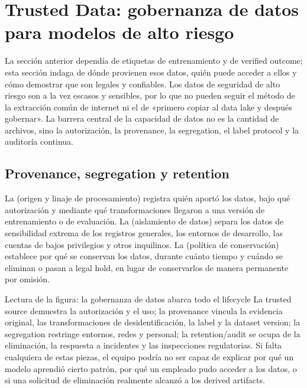 \section{Trusted Data: gobernanza de datos para modelos de alto riesgo}

La sección anterior dependía de etiquetas de entrenamiento y de verified outcome; esta sección indaga de dónde provienen esos datos, quién puede acceder a ellos y cómo demostrar que son legales y confiables. Los datos de seguridad de alto riesgo son a la vez escasos y sensibles, por lo que no pueden seguir el método de la extracción común de internet ni el de «primero copiar al data lake y después gobernar». La barrera central de la capacidad de datos no es la cantidad de archivos, sino la autorización, la provenance, la segregation, el label protocol y la auditoría continua.

\subsection{Provenance, segregation y retention}

La  (origen y linaje de procesamiento) registra quién aportó los datos, bajo qué autorización y mediante qué transformaciones llegaron a una versión de entrenamiento o de evaluación. La  (aislamiento de datos) separa los datos de sensibilidad extrema de los registros generales, los entornos de desarrollo, las cuentas de bajos privilegios y otros inquilinos. La  (política de conservación) establece por qué se conservan los datos, durante cuánto tiempo y cuándo se eliminan o pasan a legal hold, en lugar de conservarlos de manera permanente por omisión.


\begin{knowledgebox}{Lectura de la figura: la gobernanza de datos abarca todo el lifecycle}
La trusted source demuestra la autorización y el uso; la provenance vincula la evidencia original, las transformaciones de desidentificación, la label y la dataset version; la segregation restringe entornos, redes y personal; la retention/audit se ocupa de la eliminación, la respuesta a incidentes y las inspecciones regulatorias. Si falta cualquiera de estas piezas, el equipo podría no ser capaz de explicar por qué un modelo aprendió cierto patrón, por qué un empleado pudo acceder a los datos, o si una solicitud de eliminación realmente alcanzó a los derived artifacts.
\end{knowledgebox}

